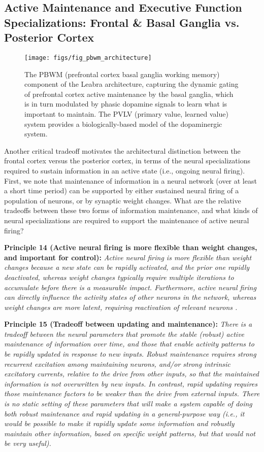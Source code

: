 \documentclass[11pt,twoside]{article}
\begin{document}
\subsection{Active Maintenance and Executive Function Specializations: Frontal \& Basal Ganglia vs. Posterior Cortex}

\begin{figure}
  \centering\texttt{[image: figs/fig\_pbwm\_architecture]}
  \caption{\small The PBWM (prefrontal cortex basal ganglia working memory) component of the Leabra architecture, capturing the dynamic gating of prefrontal cortex active maintenance by the basal ganglia, which is in turn modulated by phasic dopamine signals to learn what is important to maintain.  The PVLV (primary value, learned value) system provides a biologically-based model of the dopaminergic system. }
  \label{fig.pbwm_architecture}
\end{figure}

Another critical tradeoff motivates the architectural distinction between the frontal cortex versus the posterior cortex, in terms of the neural specializations required to sustain information in an active state (i.e., ongoing neural firing).  First, we note that maintenance of information in a neural network (over at least a short time period) can be supported by either sustained neural firing of a population of neurons, or by synaptic weight changes.  What are the relative tradeoffs between these two forms of information maintenance, and what kinds of neural specializations are required to support the maintenance of active neural firing?

{\bf Principle 14 (Active neural firing is more flexible than weight changes, and important for control):} {\em Active neural firing is more flexible than weight changes because a new state can be rapidly activated, and the prior one rapidly deactivated, whereas weight changes typically require multiple iterations to accumulate before there is a measurable impact.  Furthermore, active neural firing can directly influence the activity states of other neurons in the network, whereas weight changes are more latent, requiring reactivation of relevant neurons \cite{MunakataLatentActive}.}

{\bf Principle 15 (Tradeoff between updating and maintenance):} {\em There is a tradeoff between the neural parameters that promote the stable (robust) active maintenance of information over time, and those that enable activity patterns to be rapidly updated in response to new inputs.  Robust maintenance requires strong recurrent excitation among maintaining neurons, and/or strong intrinsic excitatory currents, relative to the drive from other inputs, so that the maintained information is not overwritten by new inputs.  In contrast, rapid updating requires those maintenance factors to be weaker than the drive from external inputs.  There is no static setting of these parameters that will make a system capable of doing both robust maintenance and rapid updating in a general-purpose way (i.e., it would be possible to make it rapidly update some information and robustly maintain other information, based on specific weight patterns, but that would not be very useful).}
\end{document}
